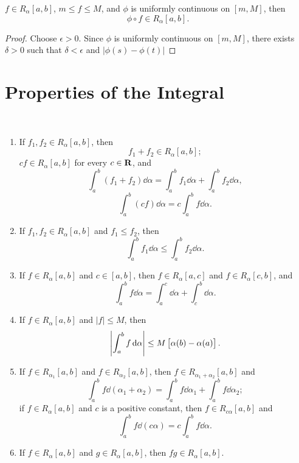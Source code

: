 \begin{theorem}
$f\in R_\alpha[a,b]$, $m\le f\le M$, and $\phi$ is uniformly continuous on $[m,M]$, then
\[ \phi\circ f\in R_\alpha[a,b]. \]
\end{theorem}

\begin{proof}
Choose $\epsilon>0$. Since $\phi$ is uniformly continuous on $[m,M]$, there exists $\delta>0$ such that $\delta<\epsilon$ and $|\phi(s)-\phi(t)|$
\end{proof}

\section{Properties of the Integral}
\begin{theorem} \
\begin{enumerate}[label=(\arabic*)]
\item If $f_1,f_2\in R_\alpha[a,b]$, then 
\[ f_1+f_2\in R_\alpha[a,b]; \]
$cf\in R_\alpha[a,b]$ for every $c\in\mathbf R$, and
\[ \int_a^b(f_1+f_2)\dd{\alpha}=\int_a^bf_1\dd{\alpha}+\int_a^bf_2\dd{\alpha}, \]
\[ \int_a^b(cf)\dd{\alpha}=c\int_a^bf\dd{\alpha}. \]

\item If $f_1,f_2\in R_\alpha[a,b]$ and $f_1\le f_2$, then
\[ \int_a^bf_1\dd{\alpha}\le\int_a^bf_2\dd{\alpha}. \]

\item If $f\in R_\alpha[a,b]$ and $c\in[a,b]$, then $f\in R_\alpha[a,c]$ and $f\in R_\alpha[c,b]$, and
\[ \int_a^bf\dd{\alpha}=\int_a^c\dd{\alpha}+\int_c^b\dd{\alpha}. \]

\item If $f\in R_\alpha[a,b]$ and $|f|\le M$, then
\[ \left|\int_a^bf\dd{\alpha}\right|\le M\left[\alpha(b)-\alpha(a)\right]. \]

\item If $f\in R_{\alpha_1}[a,b]$ and $f\in R_{\alpha_2}[a,b]$, then $f\in R_{\alpha_1+\alpha_2}[a,b]$ and
\[ \int_a^bf\dd{(\alpha_1+\alpha_2)}=\int_a^bf\dd{\alpha_1}+\int_a^bf\dd{\alpha_2}; \]
if $f\in R_\alpha[a,b]$ and $c$ is a positive constant, then $f\in R_{c\alpha}[a,b]$ and
\[ \int_a^bf\dd{(c\alpha)}=c\int_a^bf\dd{\alpha}. \]

\item If $f\in R_\alpha[a,b]$ and $g\in R_\alpha[a,b]$, then $fg\in R_\alpha[a,b]$.
\end{enumerate}
\end{theorem}

